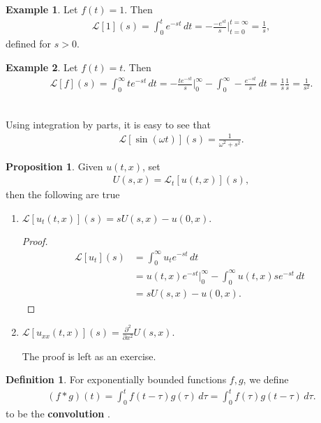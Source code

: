 \documentclass{article}
\theoremstyle{definition}
\newtheorem{defn}{Definition}[section]
\newtheorem{prop}{Proposition}[section]
\newtheorem{exmp}{Example}[section]
\newcommand{\p}{\partial}
\newcommand{\lag}{\mathcal{L}}
\newcommand{\w}{\omega}
\newcommand{\f}[2]{\frac{#1}{#2}}
\begin{document}
\begin{exmp}
	Let $f(t) = 1$. Then
	\begin{align*}
	\lag[1](s) = \int_0^t e^{-st}\,dt = -\f{-e^{st}}{s}\bigg\vert^{t=\infty}_{t = 0} = \f{1}{s},
	\end{align*}	
	defined for $s>0$. 
\end{exmp}


\begin{exmp}
	Let $f(t) = t$. Then
	\begin{align*}
	\lag[f](s) = \int_0^\infty te^{-st}\,dt = -\f{te^{-st}}{s}\bigg\vert^\infty_0 - \int_0^\infty -\f{e^{-st}}{s}\,dt = \f{1}{s}\f{1}{s} = \f{1}{s^2}.
	\end{align*}
	$\,$\\
\end{exmp}



Using integration by parts, it is easy to see that 
\begin{align*}
\lag[\sin(\w t)](s) = \f{1}{\w^2 + s^2}.
\end{align*}


\begin{prop}
	Given $u(t,x)$, set
	\begin{align*}
	U(s,x) = \lag_t[u(t,x)](s),
	\end{align*}
	then the following are true
	\begin{enumerate}
		\item $\lag[u_t(t,x)](s) = sU(s,x) - u(0,x)$.
		
		\begin{proof}
			\begin{align*}
			\lag[u_t](s) &= \int_0^\infty u_t e^{-st}\,dt \\ 
			&=  u(t,x)e^{-st}\bigg\vert^\infty_0 - \int_0^\infty u(t,x)se^{-st}\,dt \\
			&= sU(s,x) - u(0,x).
			\end{align*}
		\end{proof}
		
		\item $\lag[u_{xx}(t,x)](s) = \f{\p^2}{\p x^2}U(s,x)$.
		
		The proof is left as an exercise.\\
	\end{enumerate}
\end{prop}

\begin{defn}
For exponentially bounded functions $f,g$, we define
\begin{align*}
(f\ast g)(t) = \int_0^t f(t-\tau)g(\tau)\,d\tau = \int_0^t f(\tau)g(t-\tau)\,d\tau.
\end{align*}
to be the \textbf{convolution} .
\end{defn}
\end{document}
